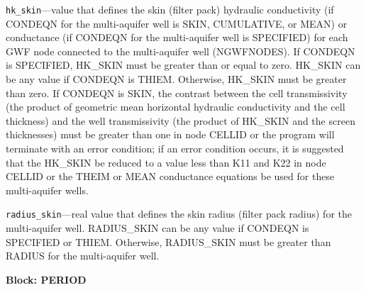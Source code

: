\begin{description}
\item \texttt{hk\_skin}---value that defines the skin (filter pack) hydraulic conductivity (if CONDEQN for the multi-aquifer well is SKIN, CUMULATIVE, or MEAN) or conductance (if CONDEQN for the multi-aquifer well is SPECIFIED) for each GWF node connected to the multi-aquifer well (NGWFNODES). If CONDEQN is SPECIFIED, HK\_SKIN must be greater than or equal to zero.  HK\_SKIN can be any value if CONDEQN is THIEM. Otherwise, HK\_SKIN must be greater than zero. If CONDEQN is SKIN, the contrast between the cell transmissivity (the product of geometric mean horizontal hydraulic conductivity and the cell thickness) and the well transmissivity (the product of HK\_SKIN and the screen thicknesses) must be greater than one in node CELLID or the program will terminate with an error condition; if an error condition occurs, it is suggested that the HK\_SKIN be reduced to a value less than K11 and K22 in node CELLID or the THEIM or MEAN conductance equations be used for these multi-aquifer wells.

\item \texttt{radius\_skin}---real value that defines the skin radius (filter pack radius) for the multi-aquifer well. RADIUS\_SKIN can be any value if CONDEQN is SPECIFIED or THIEM. Otherwise, RADIUS\_SKIN must be greater than RADIUS for the multi-aquifer well.

\end{description}
\item \textbf{Block: PERIOD}

